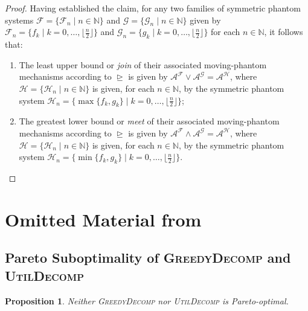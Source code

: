 \documentclass[11pt]{article}
\newcommand{\F}{\mathcal{F}}
\newcommand{\G}{\mathcal{G}}
\newcommand{\A}{\mathcal{A}}
\newcommand{\N}{\mathbb{N}}
\newcommand{\GrdDec}{\textsc{GreedyDecomp} }
\newcommand{\UtDec}{\textsc{UtilDecomp} }
\newtheorem{proposition}{Proposition}
\begin{document}
\begin{proof}
    Having established the claim, for any two families of symmetric phantom systems $\F=\{\F_n\mid n\in \N\}$ and $\G=\{\G_n\mid n\in \N\}$ given by $\F_n=\big\{f_k\mid k=0,\ldots,\big\lfloor\frac{n}{2}\big\rfloor\big\}$ and $\G_n=\big\{g_k\mid k=0,\ldots,\big\lfloor\frac{n}{2}\big\rfloor\big\}$ for each $n\in \N$, it follows that:
    \begin{enumerate}[label=(\roman*)]
        \item The least upper bound or \textit{join} of their associated moving-phantom mechanisms according to $\trianglerighteq$ is given by $\A^\F\vee \A^\G = \A^{\mathcal{H}}$, where $\mathcal{H}=\{\mathcal{H}_n\mid n\in \N\}$ is given, for each $n\in \N$, by the symmetric phantom system $\mathcal{H}_n=\big\{\max\{f_k,g_k\}\mid k=0,\ldots,\big\lfloor\frac{n}{2}\big\rfloor\big\}$;
        \item The greatest lower bound or \textit{meet} of their associated moving-phantom mechanisms according to $\trianglerighteq$ is given by $\A^\F\wedge \A^\G = \A^{\mathcal{H}}$, where $\mathcal{H}=\{\mathcal{H}_n\mid n\in \N\}$ is given, for each $n\in \N$, by the symmetric phantom system $\mathcal{H}_n=\big\{\min\{f_k,g_k\}\mid k=0,\ldots,\big\lfloor\frac{n}{2}\big\rfloor\big\}$.\qedhere
    \end{enumerate}
\end{proof}







    



\section{Omitted Material from } 

\subsection{Pareto Suboptimality of \GrdDec and \UtDec}\label{app:paretoGrdDecUtDec}

\begin{proposition} \label{prop:greedydecomp_pareto_dominated}
    Neither \GrdDec nor \UtDec is Pareto-optimal.
\end{proposition}
\end{document}
